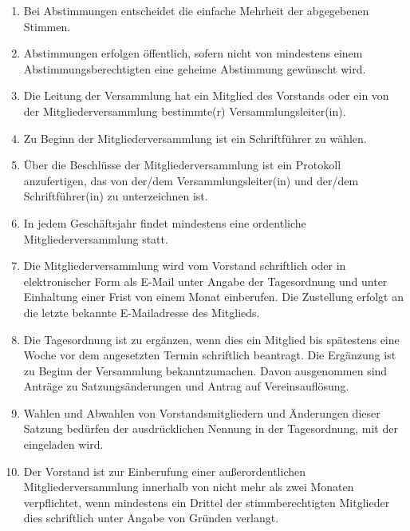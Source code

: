\documentclass[12pt,a4paper,draft]{article}
\begin{document}
\begin{enumerate}
\item Bei Abstimmungen entscheidet die einfache Mehrheit der abgegebenen 
Stimmen.

\item Abstimmungen erfolgen öffentlich, sofern nicht von mindestens einem 
Abstimmungsberechtigten eine geheime Abstimmung gewünscht wird.

\item Die Leitung der Versammlung hat ein Mitglied des Vorstands oder ein von 
der Mitgliederversammlung bestimmte(r) Versammlungsleiter(in).

\item Zu Beginn der Mitgliederversammlung ist ein Schriftführer zu wählen.

\item Über die Beschlüsse der Mitgliederversammlung ist ein Protokoll 
anzufertigen, das von der/dem Versammlungsleiter(in) und der/dem 
Schriftführer(in) zu unterzeichnen ist.


\item In jedem Geschäftsjahr findet mindestens eine ordentliche 
Mitgliederversammlung statt.

\item Die Mitgliederversammlung wird vom Vorstand schriftlich oder in 
elektronischer Form als E-Mail unter Angabe der Tagesordnung und unter 
Einhaltung einer Frist von einem Monat einberufen. %
Die Zustellung erfolgt an die letzte bekannte E-Mailadresse des Mitglieds.

\item Die Tagesordnung ist zu ergänzen, wenn dies ein Mitglied bis spätestens 
eine Woche vor dem angesetzten Termin schriftlich beantragt. Die Ergänzung 
ist zu Beginn der Versammlung bekanntzumachen. Davon ausgenommen sind Anträge zu Satzungsänderungen und Antrag auf Vereinsauflösung.

\item Wahlen und Abwahlen von Vorstandsmitgliedern und Änderungen dieser 
Satzung bedürfen der ausdrücklichen Nennung in der Tagesordnung, mit der 
eingeladen wird.

\item Der Vorstand ist zur Einberufung einer außerordentlichen 
Mitgliederversammlung innerhalb von nicht mehr als zwei Monaten verpflichtet, 
wenn mindestens ein Drittel der stimmberechtigten Mitglieder dies schriftlich unter Angabe von 
Gründen verlangt. %


\end{enumerate}
\end{document}
